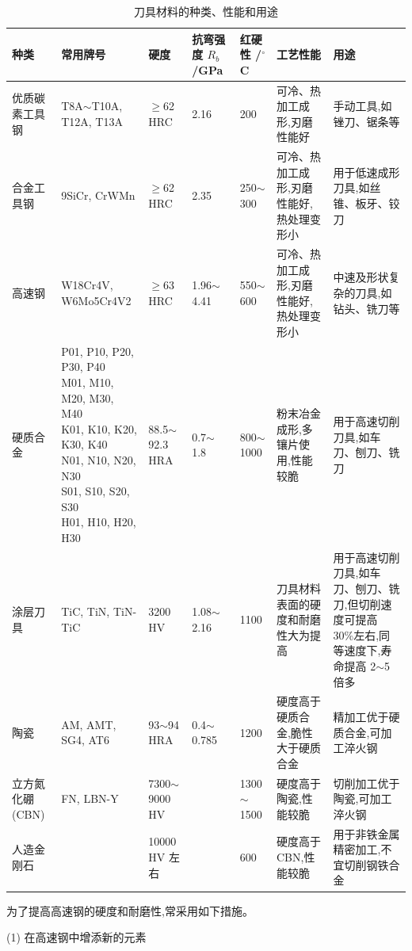 \documentclass[UTF8]{ctexbook}
\newcommand{\◎}{\ensuremath{\bigcirc}}
\begin{document}
\begin{table}[H]
\centering
\caption{刀具材料的种类、性能和用途}
\label{tab:13-2}
\footnotesize\setlength{\tabcolsep}{3pt}
\begin{tabular}{|p{1.5cm}|p{4cm}|p{1.5cm}|p{1.5cm}|p{1.5cm}|p{2.5cm}|p{2.5cm}|}
\hline
种类 & 常用牌号 & 硬度 & 抗弯强度 $R_b$/GPa & 红硬性 /$^\circ$C & 工艺性能 & 用途 \\
\hline
优质碳素工具钢 & T8A$\sim$T10A, T12A, T13A & $\geqslant$62 HRC & 2.16 & 200 & 可冷、热加工成形,刃磨性能好 & 手动工具,如锉刀、锯条等 \\
\hline
合金工具钢 & 9SiCr, CrWMn & $\geqslant$62 HRC & 2.35 & 250$\sim$300 & 可冷、热加工成形,刃磨性能好,热处理变形小 & 用于低速成形刀具,如丝锥、板牙、铰刀 \\
\hline
高速钢 & W18Cr4V, W6Mo5Cr4V2 & $\geqslant$63 HRC & 1.96$\sim$4.41 & 550$\sim$600 & 可冷、热加工成形,刃磨性能好,热处理变形小 & 中速及形状复杂的刀具,如钻头、铣刀等 \\
\hline
硬质合金 & \makecell{P01, P10, P20, P30, P40 \\ M01, M10, M20, M30, M40 \\ K01, K10, K20, K30, K40 \\ N01, N10, N20, N30 \\ S01, S10, S20, S30 \\ H01, H10, H20, H30} & 88.5$\sim$92.3 HRA & 0.7$\sim$1.8 & 800$\sim$1000 & 粉末冶金成形,多镶片使用,性能较脆 & 用于高速切削刀具,如车刀、刨刀、铣刀 \\
\hline
涂层刀具 & TiC, TiN, TiN-TiC & 3200 HV & 1.08$\sim$2.16 & 1100 & 刀具材料表面的硬度和耐磨性大为提高 & 用于高速切削刀具,如车刀、刨刀、铣刀,但切削速度可提高 30\%左右,同等速度下,寿命提高 2$\sim$5 倍多 \\
\hline
陶瓷 & AM, AMT, SG4, AT6 & 93$\sim$94 HRA & 0.4$\sim$0.785 & 1200 & 硬度高于硬质合金,脆性大于硬质合金 & 精加工优于硬质合金,可加工淬火钢 \\
\hline
立方氮化硼(CBN) & FN, LBN-Y & 7300$\sim$9000 HV & & 1300$\sim$1500 & 硬度高于陶瓷,性能较脆 & 切削加工优于陶瓷,可加工淬火钢 \\
\hline
人造金刚石 & & 10000 HV 左右 & & 600 & 硬度高于 CBN,性能较脆 & 用于非铁金属精密加工,不宜切削钢铁合金 \\
\hline
\end{tabular}\end{table}

为了提高高速钢的硬度和耐磨性,常采用如下措施。

(1) 在高速钢中增添新的元素
\end{document}
